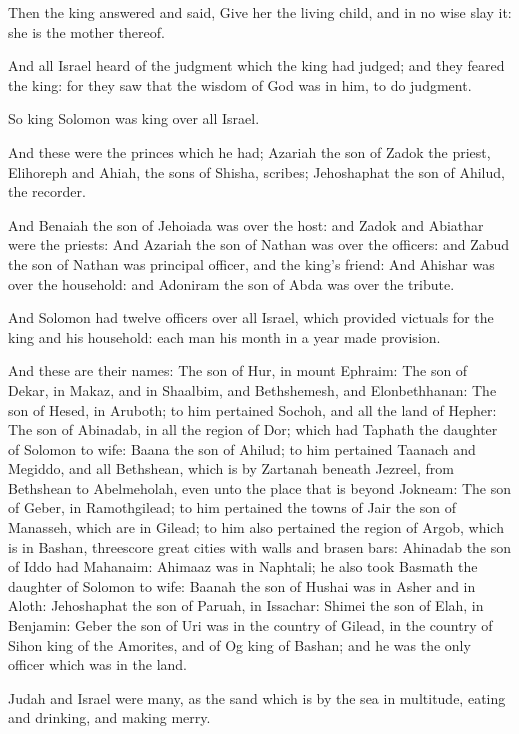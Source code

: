 \Verse Then the king answered and said, Give her the living child, and in no wise slay it: she is the mother thereof.

\Verse And all Israel heard of the judgment which the king had judged; and they feared the king: for they saw that the wisdom of God was in him, to do judgment.


\Chapter
\Verse So king Solomon was king over all Israel.

\Verse And these were the princes which he had; Azariah the son of Zadok the priest, \Verse Elihoreph and Ahiah, the sons of Shisha, scribes; Jehoshaphat the son of Ahilud, the recorder.

\Verse And Benaiah the son of Jehoiada was over the host: and Zadok and Abiathar were the priests: \Verse And Azariah the son of Nathan was over the officers: and Zabud the son of Nathan was principal officer, and the king's friend: \Verse And Ahishar was over the household: and Adoniram the son of Abda was over the tribute.

\Verse And Solomon had twelve officers over all Israel, which provided victuals for the king and his household: each man his month in a year made provision.

\Verse And these are their names: The son of Hur, in mount Ephraim: \Verse The son of Dekar, in Makaz, and in Shaalbim, and Bethshemesh, and Elonbethhanan: \Verse The son of Hesed, in Aruboth; to him pertained Sochoh, and all the land of Hepher: \Verse The son of Abinadab, in all the region of Dor; which had Taphath the daughter of Solomon to wife: \Verse Baana the son of Ahilud; to him pertained Taanach and Megiddo, and all Bethshean, which is by Zartanah beneath Jezreel, from Bethshean to Abelmeholah, even unto the place that is beyond Jokneam: \Verse The son of Geber, in Ramothgilead; to him pertained the towns of Jair the son of Manasseh, which are in Gilead; to him also pertained the region of Argob, which is in Bashan, threescore great cities with walls and brasen bars: \Verse Ahinadab the son of Iddo had Mahanaim: \Verse Ahimaaz was in Naphtali; he also took Basmath the daughter of Solomon to wife: \Verse Baanah the son of Hushai was in Asher and in Aloth: \Verse Jehoshaphat the son of Paruah, in Issachar: \Verse Shimei the son of Elah, in Benjamin: \Verse Geber the son of Uri was in the country of Gilead, in the country of Sihon king of the Amorites, and of Og king of Bashan; and he was the only officer which was in the land.

\Verse Judah and Israel were many, as the sand which is by the sea in multitude, eating and drinking, and making merry.

